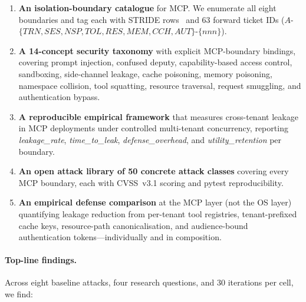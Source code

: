 \begin{enumerate}
  \item \textbf{An isolation-boundary catalogue} for MCP. We
        enumerate all eight boundaries and tag each with STRIDE
        rows~\cite{stride_orig} and 63 forward ticket IDs
        ($A$-$\{TRN,SES,NSP,TOL,RES,MEM,CCH,AUT\}$-$\{nnn\}$).
  \item \textbf{A 14-concept security taxonomy} with explicit
        MCP-boundary bindings, covering prompt injection,
        confused deputy, capability-based access control,
        sandboxing, side-channel leakage, cache poisoning,
        memory poisoning, namespace collision, tool squatting,
        resource traversal, request smuggling, and authentication
        bypass.
  \item \textbf{A reproducible empirical framework} that measures
        cross-tenant leakage in MCP deployments under controlled
        multi-tenant concurrency, reporting
        \emph{leakage\_rate}, \emph{time\_to\_leak},
        \emph{defense\_overhead}, and \emph{utility\_retention}
        per boundary.
  \item \textbf{An open attack library of 50 concrete attack
        classes} covering every MCP boundary, each with
        CVSS~v3.1 scoring and pytest reproducibility.
  \item \textbf{An empirical defense comparison} at the MCP layer
        (not the OS layer) quantifying leakage reduction from
        per-tenant tool registries, tenant-prefixed cache keys,
        resource-path canonicalisation, and audience-bound
        authentication tokens---individually and in composition.
\end{enumerate}

\paragraph{Top-line findings.}
Across eight baseline attacks, four research questions, and 30
iterations per cell, we find:

